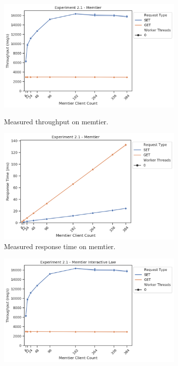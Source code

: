         \begin{figure}
            \vspace*{-.5\baselineskip}
                \centering
            \begin{subfigure}[t!]{0.45\textwidth}
                \centering
                \includegraphics[width=\textwidth]{../data_analysis/figures/2-1_mt_throughput.png}
                \caption{Measured throughput on memtier.\label{fig:21_mt_tp}}
                \includegraphics[width=\textwidth]{../data_analysis/figures/2-1_mt_response_time.png}
                \caption{Measured response time on memtier.\label{fig:21_mt_rt}}
            \end{subfigure}
            \begin{subfigure}[t!]{0.45\textwidth}
                \centering
                \includegraphics[width=\textwidth]{../data_analysis/figures/2-1_mt_throughput-il.png}

\end{subfigure}
\end{figure}

